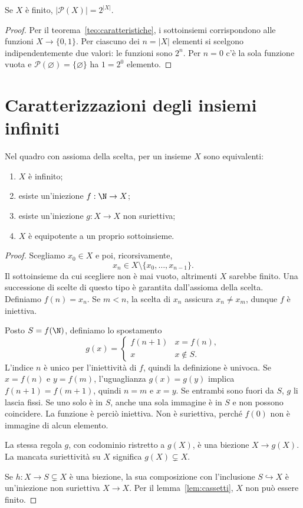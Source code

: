 \begin{corollario}
Se $X$ è finito, $|\mathcal P(X)|=2^{|X|}$.
\end{corollario}
\begin{proof}
Per il teorema~\ref{teo:caratteristiche}, i sottoinsiemi corrispondono alle funzioni $X\to\{0,1\}$. Per ciascuno dei $n=|X|$ elementi si scelgono indipendentemente due valori: le funzioni sono $2^n$. Per $n=0$ c'è la sola funzione vuota e $\mathcal P(\varnothing)=\{\varnothing\}$ ha $1=2^0$ elemento.
\end{proof}

\section{Caratterizzazioni degli insiemi infiniti}
\begin{teorema}\label{teo:infiniti}
Nel quadro con assioma della scelta, per un insieme $X$ sono equivalenti:
\begin{enumerate}[label=\alph*)]
  \item $X$ è infinito;
  \item esiste un'iniezione $f:\N\to X$;
  \item esiste un'iniezione $g:X\to X$ non suriettiva;
  \item $X$ è equipotente a un proprio sottoinsieme.
\end{enumerate}
\end{teorema}
\begin{proof}
 Scegliamo $x_0\in X$ e poi, ricorsivamente,
\[
x_n\in X\setminus\{x_0,\ldots,x_{n-1}\}.
\]
Il sottoinsieme da cui scegliere non è mai vuoto, altrimenti $X$ sarebbe finito. Una successione di scelte di questo tipo è garantita dall'assioma della scelta. Definiamo $f(n)=x_n$. Se $m<n$, la scelta di $x_n$ assicura $x_n\ne x_m$, dunque $f$ è iniettiva.

 Posto $S=f(\N)$, definiamo lo spostamento
\[
g(x)=\begin{cases}f(n+1)&x=f(n),\\x&x\notin S.\end{cases}
\]
L'indice $n$ è unico per l'iniettività di $f$, quindi la definizione è univoca. Se $x=f(n)$ e $y=f(m)$, l'uguaglianza $g(x)=g(y)$ implica $f(n+1)=f(m+1)$, quindi $n=m$ e $x=y$. Se entrambi sono fuori da $S$, $g$ li lascia fissi. Se uno solo è in $S$, anche una sola immagine è in $S$ e non possono coincidere. La funzione è perciò iniettiva. Non è suriettiva, perché $f(0)$ non è immagine di alcun elemento.

 La stessa regola $g$, con codominio ristretto a $g(X)$, è una biezione $X\to g(X)$. La mancata suriettività su $X$ significa $g(X)\subsetneq X$.

 Se $h:X\to S\subsetneq X$ è una biezione, la sua composizione con l'inclusione $S\hookrightarrow X$ è un'iniezione non suriettiva $X\to X$. Per il lemma~\ref{lem:cassetti}, $X$ non può essere finito.
\end{proof}

